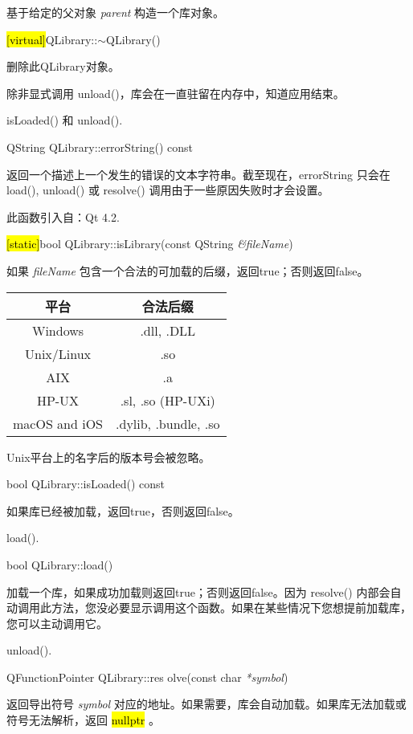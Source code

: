 基于给定的父对象 \emph{parent} 构造一个库对象。

\hl{[virtual]}QLibrary::$\sim$QLibrary()

删除此QLibrary对象。

除非显式调用 unload()，库会在一直驻留在内存中，知道应用结束。

\begin{seeAlso}
isLoaded() 和 unload().
\end{seeAlso}


QString QLibrary::errorString() const

返回一个描述上一个发生的错误的文本字符串。截至现在，errorString 只会在 load(), unload() 或 resolve() 调用由于一些原因失败时才会设置。

此函数引入自：Qt 4.2.


\hl{[static]}bool QLibrary::isLibrary(const QString \emph{\&fileName})

如果 \emph{fileName} 包含一个合法的可加载的后缀，返回true；否则返回false。

\begin{tabular}{|c|c|}
\hline
平台& 	合法后缀\\
\hline
Windows& 	.dll, .DLL\\
\hline
Unix/Linux& 	.so\\
\hline
AIX 	&.a\\
\hline
HP-UX 	&.sl, .so (HP-UXi)\\
\hline
macOS and iOS& 	.dylib, .bundle, .so\\
\hline
\end{tabular}

Unix平台上的名字后的版本号会被忽略。

bool QLibrary::isLoaded() const

如果库已经被加载，返回true，否则返回false。

\begin{seeAlso}
load().
\end{seeAlso}

bool QLibrary::load()

加载一个库，如果成功加载则返回true；否则返回false。因为 resolve() 内部会自动调用此方法，您没必要显示调用这个函数。如果在某些情况下您想提前加载库，您可以主动调用它。

\begin{seeAlso}
unload().
\end{seeAlso}

QFunctionPointer QLibrary::res
olve(const char \emph{*symbol})

返回导出符号 \emph{symbol} 对应的地址。如果需要，库会自动加载。如果库无法加载或符号无法解析，返回 \hl{nullptr} 。

